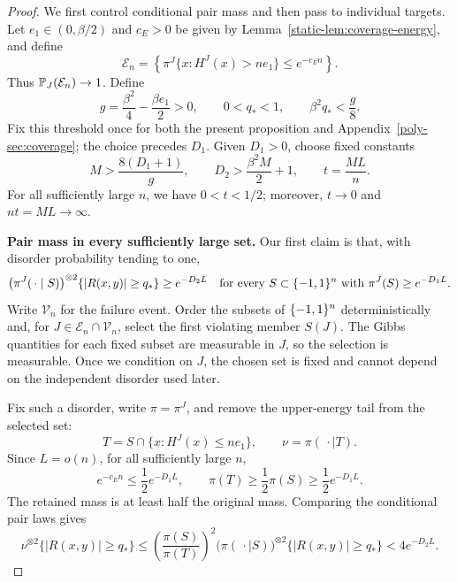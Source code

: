 \begin{proof}
We first control conditional pair mass and then pass to individual targets.
Let $e_1\in(0,\beta/2)$ and $c_E>0$ be given by
Lemma~\ref{static-lem:coverage-energy}, and define
\[
 \mathcal E_n
 =\left\{\pi^J\{x:H^J(x)>ne_1\}\le e^{-c_En}\right\}.
\]
Thus $\mathbb P_J(\mathcal E_n)\to1$.  Define
\[
 g=\frac{\beta^2}{4}-\frac{\beta e_1}{2}>0,
 \qquad
 0<q_*<1,\qquad \beta^2q_*<\frac g8.
\]
Fix this threshold once for both the present proposition and
Appendix~\ref{poly-sec:coverage}; the choice precedes $D_1$.
Given $D_1>0$, choose fixed constants
\begin{equation}
 M>\frac{8(D_1+1)}g,
 \qquad
 D_2>\frac{\beta^2M}{2}+1,
 \qquad
 t=\frac{ML}{n}.
 \label{eq:coverage-parameters}
\end{equation}
For all sufficiently large $n$, we have $0<t<1/2$;
moreover, $t\to0$ and $nt=ML\to\infty$.

\par\medskip\noindent\textbf{Pair mass in every sufficiently large set.}\enspace
Our first claim is that, with disorder probability tending to one,
\begin{equation}
 \bigl(\pi^J(\,\cdot\mid S)\bigr)^{\otimes2}
   \{|R(x,y)|\ge q_*\}
 \ge e^{-D_2L}
 \quad\text{for every }S\subset\{-1,1\}^n
 \text{ with }\pi^J(S)\ge e^{-D_1L}.
 \label{eq:coverage-pair}
\end{equation}
Write $\mathcal V_n$ for the failure event. Order the subsets of $\{-1,1\}^n$
deterministically and, for $J\in\mathcal E_n\cap\mathcal V_n$, select
the first violating member $S(J)$. The Gibbs quantities for each fixed
subset are measurable in $J$, so the selection is measurable. Once we
condition on $J$, the chosen set is fixed and cannot depend on the
independent disorder used later.

Fix such a disorder, write $\pi=\pi^J$, and remove the upper-energy
tail from the selected set:
\[
 T=S\cap\{x:H^J(x)\le ne_1\},
 \qquad \nu=\pi(\,\cdot\mid T).
\]
Since $L=o(n)$, for all sufficiently large $n$,
\[
 e^{-c_En}\le\frac12e^{-D_1L},
 \qquad
 \pi(T)\ge\frac12\pi(S)\ge\frac12e^{-D_1L}.
\]
The retained mass is at least half the original mass. Comparing the
conditional pair laws gives
\begin{equation}
 \nu^{\otimes2}\{|R(x,y)|\ge q_*\}
 \le
 \left(\frac{\pi(S)}{\pi(T)}\right)^2
 \bigl(\pi(\,\cdot\mid S)\bigr)^{\otimes2}
   \{|R(x,y)|\ge q_*\}
 <4e^{-D_2L}.
 \label{eq:coverage-trimming}
\end{equation}


\end{proof}
